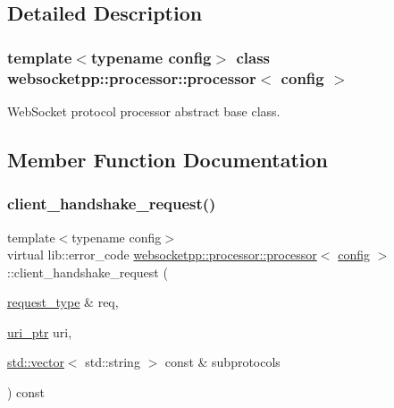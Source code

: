 \subsection{Detailed Description}
\subsubsection*{template$<$typename config$>$\newline
class websocketpp\+::processor\+::processor$<$ config $>$}

Web\+Socket protocol processor abstract base class. 

\subsection{Member Function Documentation}
\mbox{\label{classwebsocketpp_1_1processor_1_1processor_ab5bc7b8f480ee28049f44232115bcaab}} 
\subsubsection{\texorpdfstring{client\+\_\+handshake\+\_\+request()}{client\_handshake\_request()}}
{\footnotesize\ttfamily template$<$typename config$>$ \\
virtual lib\+::error\+\_\+code \mbox{\hyperlink{classwebsocketpp_1_1processor_1_1processor}{websocketpp\+::processor\+::processor}}$<$ \mbox{\hyperlink{classconfig}{config}} $>$\+::client\+\_\+handshake\+\_\+request (\begin{DoxyParamCaption}\item[{\mbox{\hyperlink{classwebsocketpp_1_1http_1_1parser_1_1request}{request\+\_\+type}} \&}]{req,  }\item[{\mbox{\hyperlink{namespacewebsocketpp_aae370ea5ac83a8ece7712cb39fc23f5b}{uri\+\_\+ptr}}}]{uri,  }\item[{\mbox{\hyperlink{classstd_1_1vector}{std\+::vector}}$<$ std\+::string $>$ const \&}]{subprotocols }\end{DoxyParamCaption}) const\hspace{0.3cm}{\ttfamily [pure virtual]}}



